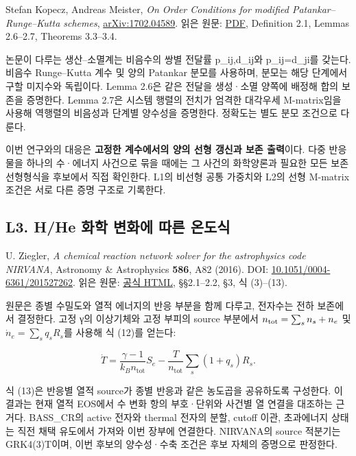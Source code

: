 Stefan Kopecz, Andreas Meister, \emph{On Order Conditions for modified Patankar--Runge--Kutta schemes}, \href{https://arxiv.org/abs/1702.04589}{arXiv:1702.04589}. 읽은 원문: \href{https://arxiv.org/pdf/1702.04589}{PDF}, Definition 2.1, Lemmas 2.6--2.7, Theorems 3.3--3.4.

논문이 다루는 생산--소멸계는 비음수의 쌍별 전달률 p\_ij,d\_ij와 p\_ij=d\_ji를 갖는다. 비음수 Runge--Kutta 계수 및 양의 Patankar 분모를 사용하며, 분모는 해당 단계에서 구할 미지수와 독립이다. Lemma 2.6은 같은 전달을 생성·소멸 양쪽에 배정해 합의 보존을 증명한다. Lemma 2.7은 시스템 행렬의 전치가 엄격한 대각우세 M-matrix임을 사용해 역행렬의 비음성과 단계별 양수성을 증명한다. 정확도는 별도 분모 조건으로 다룬다.

이번 연구와의 대응은 \textbf{고정한 계수에서의 양의 선형 갱신과 보존 출력}이다. 다중 반응물을 하나의 수·에너지 사건으로 묶을 때에는 그 사건의 화학양론과 필요한 모든 보존 선형형식을 후보에서 직접 확인한다. L1의 비선형 공통 가중치와 L2의 선형 M-matrix 조건은 서로 다른 증명 구조로 기록한다.

\hypertarget{l3.-hhe-uxd654uxd559-uxbcc0uxd654uxc5d0-uxb530uxb978-uxc628uxb3c4uxc2dd}{%
\subsection{L3. H/He 화학 변화에 따른 온도식}\label{l3.-hhe-uxd654uxd559-uxbcc0uxd654uxc5d0-uxb530uxb978-uxc628uxb3c4uxc2dd}}

U. Ziegler, \emph{A chemical reaction network solver for the astrophysics code NIRVANA}, Astronomy \& Astrophysics \textbf{586}, A82 (2016). DOI: \href{https://doi.org/10.1051/0004-6361/201527262}{10.1051/0004-6361/201527262}. 읽은 원문: \href{https://www.aanda.org/articles/aa/full_html/2016/02/aa27262-15/aa27262-15.html}{공식 HTML}, §§2.1--2.2, §3, 식 (3)--(13).

원문은 종별 수밀도와 열적 에너지의 반응 부분을 함께 다루고, 전자수는 전하 보존에서 결정한다. 고정 γ의 이상기체와 고정 부피의 source 부분에서 \(n_{\rm tot}=\sum_s n_s+n_e\) 및 \(\dot n_e=\sum_s q_s R_s\)를 사용해 식 (12)를 얻는다:

\[
\dot T=\frac{\gamma-1}{k_Bn_{\mathrm{tot}}}S_e-
\frac{T}{n_{\mathrm{tot}}}\sum_s(1+q_s)R_s.
\]

식 (13)은 반응별 열적 source가 종별 반응과 같은 농도곱을 공유하도록 구성한다. 이 결과는 현재 열적 EOS에서 수 변화 항의 부호·단위와 사건별 열 연결을 대조하는 근거다. BASS\_CR의 active 전자와 thermal 전자의 분할, cutoff 이관, 초과에너지 상태는 직전 채택 유도에서 가져와 이번 장부에 연결한다. NIRVANA의 source 적분기는 GRK4(3)T이며, 이번 후보의 양수성·수축 조건은 후보 자체의 증명으로 판정한다.

